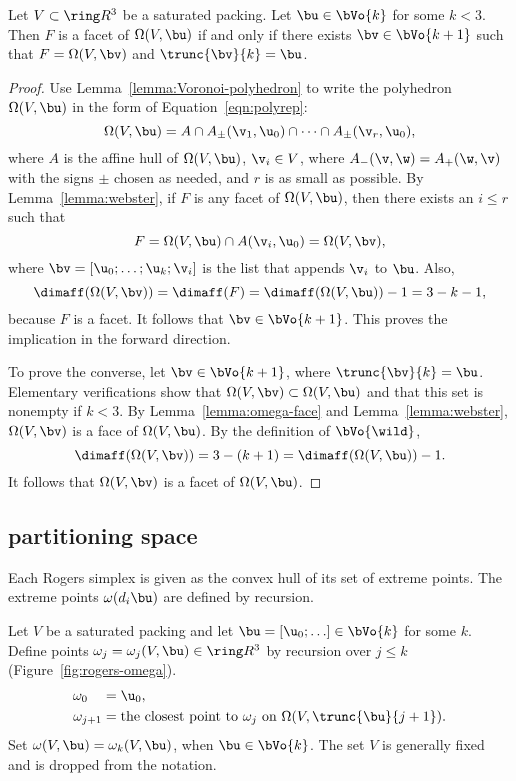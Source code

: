 \begin{cnl}
\begin{lemma}[facets]
\label{lemma:omega-facet} 
%
Let $V\subset\vecR{3}$ be a saturated packing.  Let $\bu\in \bVo{k}$
for some $k<3$.  Then $F$ is a facet of $\Omega(V,\bu)$ if and only if
there exists $\bv\in \bVo{k+1}$ such that $F = \Omega(V,\bv)$ and
$\trunc{\bv}{k} = \bu$.
\end{lemma}

\begin{proof} 
  Use Lemma~\ref{lemma:Voronoi-polyhedron} to write the polyhedron $\Omega(V,\bu)$ in
  the form of Equation~\ref{eqn:polyrep}:
\[  
\Omega(V,\bu) = A \cap A_\pm(\v_1,\u_0) \cap \cdots\cap A_\pm(\v_r,\u_0),
\] 
where $A$ is the affine hull of $\Omega(V,\bu)$, $\v_i\in V$, where
$\Aminus(\v,\w) = \Aplus(\w,\v)$ with the signs $\pm$ chosen as needed, and
$r$ is as small as possible.  By Lemma~\ref{lemma:webster}, if $F$ is
any facet of $\Omega(V,\bu)$, then there exists an $i\le r$ such that
\[  
F = \Omega(V,\bu) \cap \AA{\v_i}{\u_0} = \Omega(V,\bv),
\] 
where $\bv = [\u_0;\ldots;\u_k;\v_i]$ is the list that appends $\v_i$
to $\bu$.  Also,
\[  
\dimaff(\Omega(V,\bv)) = \dimaff(F) = \dimaff(\Omega(V,\bu)) - 1 = 3 - k - 1,
\] 
because $F$ is a facet.  It follows that $\bv \in \bVo{k+1}$.  This
proves the implication in the forward direction.

To prove the converse, let $\bv\in \bVo{k+1}$, where $\trunc{\bv}{k} =
\bu$.  Elementary verifications show that $\Omega(V,\bv)\subset
\Omega(V,\bu)$ and that this set is nonempty if $k<3$.  By
Lemma~\ref{lemma:omega-face} and Lemma~\ref{lemma:webster},
$\Omega(V,\bv)$ is a face of $\Omega(V,\bu)$.  By the definition of
$\bVo{\wild }$,
\[  
\dimaff(\Omega(V,\bv)) = 3 - (k+1) = \dimaff(\Omega(V,\bu)) -1.
\] 
It follows that $\Omega(V,\bv)$ is a facet of $\Omega(V,\bu)$.
\end{proof}


\subsection{partitioning space}\label{partitioning space}

Each Rogers simplex is given as the convex hull of  its set of extreme points.  
The extreme points $\omega(d_i\bu)$
are defined by recursion.

\begin{definition}[$\omega$]
\label{def:omega}
%
Let $V$ be a saturated packing and let $\bu=[\u_0;\ldots]\in \bVo{k}$
for some $k$.  Define points $\omega_j=\omega_j(V,\bu)\in\vecR{3}$ by
recursion over $j\le k$ (Figure~\ref{fig:rogers-omega}).
\begin{align*}
\omega_{0\phantom{+1}} &= \u_0,\\
\omega_{j+1} &=\text{the closest point to } \omega_j 
\text{ on }\Omega(V,\trunc{\bu}{j+1}).
\end{align*}
Set $\omega(V,\bu) = \omega_{k}(V,\bu)$, when $\bu\in \bVo{k}$.  The
set $V$ is generally fixed and is dropped from the notation.
\end{definition}


\end{cnl}
